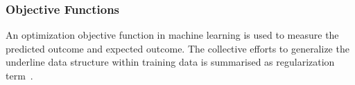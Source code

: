 \subsubsection{Objective Functions}
An optimization objective function in machine learning is used to measure the predicted outcome and expected outcome. The collective efforts to generalize the underline data structure within training data is summarised as regularization term~\cite{goodfellow_2015}.  